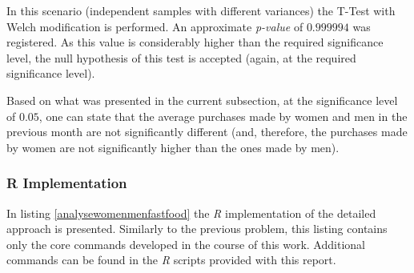 \documentclass[12pt]{article}
\begin{document}
In this scenario (independent samples with different variances) the T-Test with Welch modification is performed. An approximate \emph{p-value} of $0.999994$ was registered. As this value is considerably higher than the required significance level, the null hypothesis of this test is accepted (again, at the required significance level).

Based on what was presented in the current subsection, at the significance level of $0.05$, one can state that the  average purchases made by women and men in the previous month are not significantly different (and, therefore, the purchases made by women are not significantly higher than the ones made by men).

\subsubsection{R Implementation}

In listing \ref{analysewomenmenfastfood} the \emph{R} implementation of the detailed approach is presented. Similarly to the previous problem, this listing contains only the core commands developed in the course of this work. Additional commands can be found in the \emph{R} scripts provided with this report.
\end{document}
